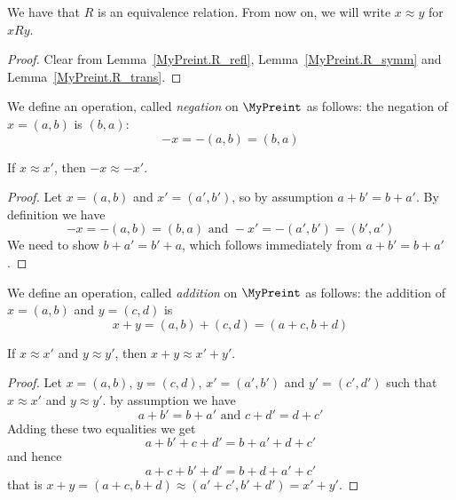 \begin{lemma}
    \label{MyPreint.R_equiv}
    \leanok
We have that $R$ is an equivalence relation. From now on, we will write $x \approx y$ for
$x R y$.
\end{lemma}
\begin{proof}
    \leanok
Clear from Lemma~\ref{MyPreint.R_refl}, Lemma~\ref{MyPreint.R_symm} and Lemma~\ref{MyPreint.R_trans}.
\end{proof}

\begin{definition}
    \label{MyPreint.neg}
    \leanok
We define an operation, called \emph{negation} on $\MyPreint$ as follows: the negation of $x = (a,b)$ is
$(b,a)$:
\[
-x = -(a,b) = (b,a)
\]
\end{definition}

\begin{lemma}
    \label{MyPreint.neg_quotient}
    \leanok
If $x \approx x'$, then $-x \approx -x'$.
\end{lemma}
\begin{proof}
\leanok
Let $x = (a,b)$ and $x' = (a',b')$, so by assumption $a + b' = b + a'$. By definition we have
\[
-x=-(a,b)=(b,a) \mbox{ and } -x'=-(a',b')=(b',a')
\]
We need to show $b+a'=b'+a$, which follows immediately from $a + b' = b + a'$.
\end{proof}

\begin{definition}
    \label{MyPreint.add}
    \leanok
We define an operation, called \emph{addition} on $\MyPreint$ as follows: the addition of $x = (a,b)$
and $y = (c, d)$ is
\[
x + y = (a,b) + (c,d) = (a+c, b + d)
\]
\end{definition}

\begin{lemma}
    \label{MyPreint.add_quotient}
    \leanok
If $x \approx x'$ and $y \approx y'$, then $x + y \approx x' + y'$.
\end{lemma}
\begin{proof}
\leanok
Let $x = (a,b)$, $y = (c,d)$, $x' = (a',b')$ and $y' = (c',d')$ such that $x \approx x'$ and $y \approx y'$. by assumption we have
\[
a + b' = b + a' \mbox{ and } c + d' = d + c'
\]
Adding these two equalities we get
\[
a+b'+c+d'=b+a'+d+c'
\]
and hence
\[
a+c+b'+d'=b+d+a'+c'
\]
that is $x + y = (a+c,b+d) \approx (a'+c',b'+d') = x'+y'$.
\end{proof}

